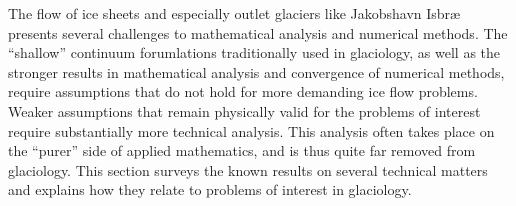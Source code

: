 The flow of ice sheets and especially outlet glaciers like Jakobshavn Isbr{\ae} presents several challenges to mathematical analysis and numerical methods.
The ``shallow'' continuum forumlations traditionally used in glaciology, as well as the stronger results in mathematical analysis and convergence of numerical methods, require assumptions that do not hold for more demanding ice flow problems.
Weaker assumptions that remain physically valid for the problems of interest require substantially more technical analysis.
This analysis often takes place on the ``purer'' side of applied mathematics, and is thus quite far removed from glaciology.
This section surveys the known results on several technical matters and explains how they relate to problems of interest in glaciology.
